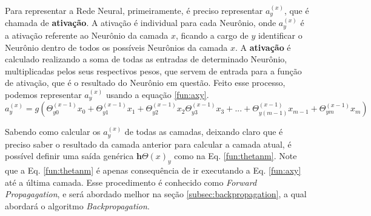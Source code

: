 \begin{figure}
\label{fg:rede_neural_generica}
\end{figure}


Para representar a Rede Neural, primeiramente, é preciso  representar $a^{(x)}_y$, que é chamada de \textbf{ativação}. A ativação é individual para cada Neurônio, onde $a^{(x)}_y$ é a ativação referente ao Neurônio da camada $x$, ficando a cargo de $y$ identificar o Neurônio dentro de todos os possíveis Neurônios da camada $x$. A \textbf{ativação} é calculado realizando a soma de todas as entradas de determinado Neurônio, multiplicadas pelos seus respectivos pesos, que servem de entrada para a função de ativação, que é o resultado do Neurônio em questão. Feito esse processo, podemos representar $a^{(x)}_y$ usando a equação \ref{fun:axy}.
\begin{equation}
    a^{(x)}_y=g(\Theta^{(x-1)}_{y0}x{}_0+\Theta^{(x-1)}_{y1}x{}_1+\Theta^{(x-1)}_{y2}x{}_2\Theta^{(x-1)}_{y3}x{}_3+...+\Theta^{(x-1)}_{y(m-1)}x{}_{m-1}+\Theta^{(x-1)}_{ym}x{}_m )
    \label{fun:axy}
\end{equation}


Sabendo como calcular os $a^{(x)}_y$ de todas as camadas, deixando claro que é preciso saber o resultado da camada anterior para calcular a camada atual, é possível definir uma saída genérica $\mathbf{h}{\Theta}(x)_y$ como na  Eq. \eqref{fun:thetanm}. Note que a Eq. \eqref{fun:thetanm} é apenas consequência de ir executando a Eq.  \eqref{fun:axy} até a última camada. Esse procedimento é conhecido como \textit{Forward Propagagation}, e será abordado melhor na seção \ref{subsec:backpropagation}, a qual abordará o algoritmo \textit{Backpropagation}.

